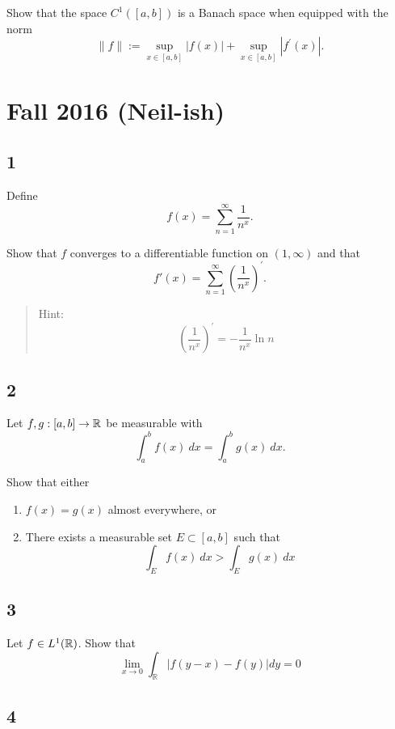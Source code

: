 Show that the space \(C^1([a, b])\) is a Banach space when equipped with
the norm \[
\|f\|:=\sup _{x \in[a, b]}|f(x)|+\sup _{x \in[a, b]}\left|f^{\prime}(x)\right|.
\]

\hypertarget{fall-2016-neil-ish}{%
\section{Fall 2016 (Neil-ish)}\label{fall-2016-neil-ish}}

\hypertarget{section}{%
\subsection{1}\label{section}}

Define \[
f(x) = \sum_{n=1}^{\infty} \frac{1}{n^{x}}.
\]

Show that \(f\) converges to a differentiable function on
\((1, \infty)\) and that \[
f'(x)  =\sum_{n=1}^{\infty}\left(\frac{1}{n^{x}}\right)^{\prime}.
\]

\begin{quote}
Hint: \[
\left(\frac{1}{n^{x}}\right)^{\prime}=-\frac{1}{n^{x}} \ln n
\]
\end{quote}

\hypertarget{section-1}{%
\subsection{2}\label{section-1}}

Let \(f, g: [a, b] \to {\mathbb{R}}\) be measurable with \[
\int_{a}^{b} f(x) ~d x=\int_{a}^{b} g(x) ~d x.
\]

Show that either

\begin{enumerate}
\def\labelenumi{\arabic{enumi}.}
\tightlist
\item
  \(f(x) = g(x)\) almost everywhere, or
\item
  There exists a measurable set \(E \subset [a, b]\) such that \[
  \int_{E} f(x) ~d x>\int_{E} g(x) ~d x
  \]
\end{enumerate}

\hypertarget{section-2}{%
\subsection{3}\label{section-2}}

Let \(f\in L^1({\mathbb{R}})\). Show that \[
\lim _{x \rightarrow 0} \int_{\mathbb{R}}|f(y-x)-f(y)| d y=0
\]

\hypertarget{section-3}{%
\subsection{4}\label{section-3}}

